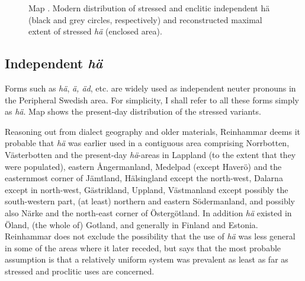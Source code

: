\begin{stylecaption}
  [Warning: Image ignored] %
 

\end{stylecaption}

\begin{figure}[h]

\begin{minipage}{5.5102in}

\begin{stylecaption}
Map . Modern distribution of stressed and enclitic independent hä (black and grey circles, respectively) and reconstructed maximal extent of stressed \textit{hä} (enclosed area).

\end{stylecaption}

\end{minipage}

\end{figure}

\subsection{Independent \textit{hä}}

\begin{styleBodyTextFirst}
Forms such as \textit{hä}, \textit{ä, äd}, etc. are widely used as independent neuter pronouns in the Peripheral Swedish area. For simplicity, I shall refer to all these forms simply as \textit{hä}. Map  shows the present-day distribution of the stressed variants. 

\end{styleBodyTextFirst}

\begin{styleBodytextC}
Reasoning out from dialect geography and older materials, Reinhammar deems it probable that \textit{hä} was earlier used in a contiguous area comprising Norrbotten, Västerbotten and the present-day \textit{hä}{}-areas in Lappland (to the extent that they were populated), eastern Ångermanland, Medelpad (except Haverö) and the easternmost corner of Jämtland, Hälsingland except the north-west, Dalarna except in north-west, Gästrikland, Uppland, Västmanland except possibly the south-western part, (at least) northern and eastern Södermanland, and possibly also Närke and the north-east corner of Östergötland. In addition \textit{hä} existed in Öland, (the whole of) Gotland, and generally in Finland and Estonia. Reinhammar does not exclude the possibility that the use of \textit{hä} was less general in some of the areas where it later receded, but says that the most probable assumption is that a relatively uniform system was prevalent as least as far as stressed and proclitic uses are concerned.

\end{styleBodytextC}

